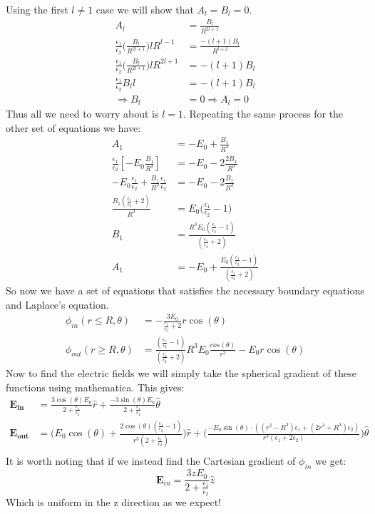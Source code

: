 \documentclass[a4paper, 11pt]{article}
\begin{document}
Using the first $l\neq1$ case we will show that $A_l=B_l=0$.
	\begin{align*}
		A_l &= \frac{B_l}{R^{2l+1}} \\
		\frac{\epsilon_1}{\epsilon_2}\Big(\frac{B_l}{R^{2l+1}}\Big)lR^{l-1} &= \frac{-(l+1)B_l}{R^{l+2}} \\ 
		\frac{\epsilon_1}{\epsilon_2}\Big(\frac{B_l}{R^{2l+1}}\Big)lR^{2l+1} &= -(l+1)B_l \\ 
		\frac{\epsilon_1}{\epsilon_2}B_ll &= -(l+1)B_l \\ 	
		\Rightarrow B_l &= 0 \Rightarrow A_l = 0	
	\end{align*}
Thus all we need to worry about is $l=1$. Repeating the same process for the other set of equations we have: 
	\begin{align*}
		A_1 &= -E_0+\frac{B_1}{R^3} \\ 
		\frac{\epsilon_1}{\epsilon_2}[-E_0 \frac{B_1}{R^3}] &= -E_0 -2\frac{2B_1}{R^3} \\ 
		-E_0\frac{\epsilon_1}{\epsilon_2}+\frac{B_1}{R^3}\frac{\epsilon_1}{\epsilon_2}& =-E_0-2\frac{B_1}{R^3} \\
		\frac{B_1(\frac{\epsilon_1}{\epsilon_2}+2)}{R^3} &= E_0\Big(\frac{\epsilon_1}{\epsilon_2}-1\Big) \\
		B_1 &= \frac{R^3E_0(\frac{\epsilon_1}{\epsilon_2}-1)}{(\frac{\epsilon_1}{\epsilon_2}+2)} \\
		A_1 &= -E_0 + \frac{E_0(\frac{\epsilon_1}{\epsilon_2}-1)}{(\frac{\epsilon_1}{\epsilon_2}+2)}
	\end{align*}
So now we have a set of equations that satisfies the necessary boundary equations and Laplace's equation. 
	\begin{align}
		\phi_{in}(r\leq R, \theta) &= -\frac{3E_0}{\frac{\epsilon_1}{\epsilon_2}+2}r\cos(\theta)\\
		\phi_{out}(r\geq R, \theta) &= \frac{(\frac{\epsilon_1}{\epsilon_2}-1)}{(\frac{\epsilon_1}{\epsilon_2}+2)}R^3E_0\frac{cos(\theta)}{r^2}-E_0r\cos(\theta)
	\end{align}	
Now to find the electric fields we will simply take the spherical gradient of these functions using mathematica. This gives: 
	\begin{align*}
		\mathbf{E_{in}} &=  \frac{3\cos(\theta)E_0}{2+\frac{\epsilon_1}{\epsilon_2}} \hat{r} + \frac{-3\sin(\theta)E_0}{2+\frac{\epsilon_1}{\epsilon_2}} \hat{\theta}   \\
		\mathbf{E_{out}} &= \Bigg(E_0\cos(\theta)+\frac{2\cos(\theta)(\frac{\epsilon_1}{\epsilon_2}-1)}{r^3(2+\frac{\epsilon_1}{\epsilon_2})} \Bigg) \hat{r} + 
		 \Bigg(\frac{-E_0\sin(\theta)\cdot((r^3-R^3)\epsilon_1+(2r^3+R^3)\epsilon_2)}{r^3(\epsilon_1+2\epsilon_2)} \Bigg) \hat{\theta}\\ 
	\end{align*}	
It is worth noting that if we instead find the Cartesian gradient of $\phi_{in}$ we get: 
	\begin{equation}
		\mathbf{E}_{in} = \frac{3zE_0}{2+\frac{\epsilon_1}{\epsilon_2}}\hat{z}
	\end{equation}	
Which is uniform in the z direction as we expect!\\
\end{document}

